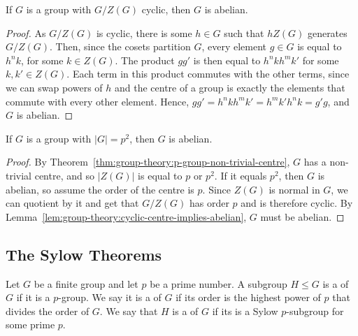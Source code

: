 \begin{lemma}\label{lem:group-theory:cyclic-centre-implies-abelian}
  If \(G\) is a group with \(G / Z(G)\) cyclic, then \(G\) is abelian.
\end{lemma}

\begin{proof}
  As \(G / Z(G)\) is cyclic, there is some \(h \in G\) such that \(hZ(G)\) generates \(G / Z(G)\). Then, since the cosets partition \(G\), every element \(g \in G\) is equal to \(h^{n}k\), for some \(k \in Z(G)\). The product \(gg'\) is then equal to \(h^{n}kh^{m}k'\) for some \(k, k' \in Z(G)\). Each term in this product commutes with the other terms, since we can swap powers of \(h\) and the centre of a group is exactly the elements that commute with every other element. Hence, \(gg' = h^{n}kh^{m}k' = h^{m}k'h^{n}k = g'g\), and \(G\) is abelian.
\end{proof}

\begin{corollary}
  If \(G\) is a group with \(|G| = p^{2}\), then \(G\) is abelian.
\end{corollary}

\begin{proof}
  By Theorem~\ref{thm:group-theory:p-group-non-trivial-centre}, \(G\) has a non-trivial centre, and so \(|Z(G)|\) is equal to \(p\) or \(p^{2}\). If it equals \(p^{2}\), then \(G\) is abelian, so assume the order of the centre is \(p\). Since \(Z(G)\) is normal in \(G\), we can quotient by it and get that \(G/Z(G)\) has order \(p\) and is therefore cyclic. By Lemma~\ref{lem:group-theory:cyclic-centre-implies-abelian}, \(G\) must be abelian.
\end{proof}


\subsection{The Sylow Theorems}

\begin{definition}\label{def:group-theory:sylow-subgroup}
  Let \(G\) be a finite group and let \(p\) be a prime number. A subgroup \(H \leq G\) is a  of \(G\) if it is a \(p\)-group. We say it is a  of \(G\) if its order is the highest power of \(p\) that divides the order of \(G\). We say that \(H\) is a  of \(G\) if its is a Sylow \(p\)-subgroup for some prime \(p\).
\end{definition}

